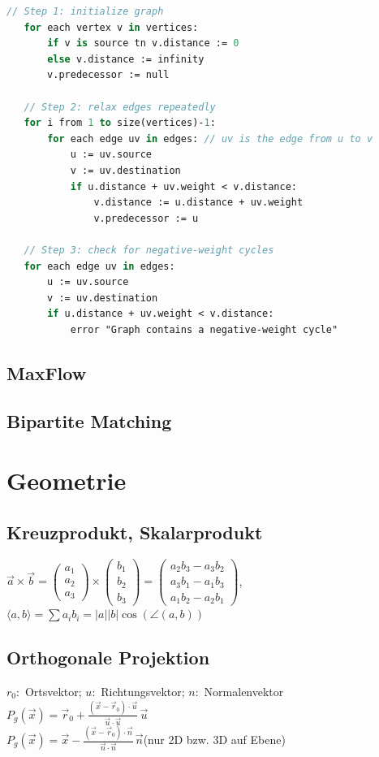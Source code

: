 \documentclass[10pt,a4paper,ngerman,oneside,]{article}
\begin{document}
\begin{multicols}{2}
\begin{lstlisting}[language=pascal]
   // Step 1: initialize graph
   for each vertex v in vertices:
       if v is source tn v.distance := 0
       else v.distance := infinity
       v.predecessor := null

   // Step 2: relax edges repeatedly
   for i from 1 to size(vertices)-1:
       for each edge uv in edges: // uv is the edge from u to v
           u := uv.source
           v := uv.destination
           if u.distance + uv.weight < v.distance:
               v.distance := u.distance + uv.weight
               v.predecessor := u

   // Step 3: check for negative-weight cycles
   for each edge uv in edges:
       u := uv.source
       v := uv.destination
       if u.distance + uv.weight < v.distance:
           error "Graph contains a negative-weight cycle"
\end{lstlisting}
\subsection{MaxFlow}

\subsection{Bipartite Matching}

\hash{--------------------------------}
\section{Geometrie}
\subsection{Kreuzprodukt, Skalarprodukt}
$\vec{a}\times\vec{b}
  =
  \begin{pmatrix}a_1 \\ a_2 \\ a_3\end{pmatrix}
  \times
  \begin{pmatrix}b_1 \\ b_2 \\ b_3 \end{pmatrix}
  =
  \begin{pmatrix}
    a_2b_3 - a_3b_2 \\
    a_3b_1 - a_1b_3 \\
    a_1b_2 - a_2b_1
  \end{pmatrix}$,~~$\langle a,b\rangle=\sum a_ib_i=|a||b|\cos(\angle(a,b))$
\subsection{Orthogonale Projektion}
$r_0:$ Ortsvektor; $u:$ Richtungsvektor; $n:$ Normalenvektor\\
$P_g(\vec x) =  \vec r_0 + \frac{( \vec x - \vec r_0 ) \cdot \vec u}{\vec u \cdot \vec u} \, \vec u$\\
$P_g(\vec x) = \vec x - \frac{( \vec x - \vec r_0 ) \cdot \vec n}{\vec n \cdot \vec n} \, \vec n$(nur 2D bzw. 3D auf Ebene)\\

\end{multicols}
\end{document}
